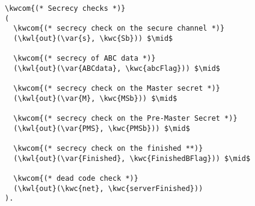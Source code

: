 \begin{Verbatim}[commandchars=\\\{\},codes={\catcode`$=3}]
\kwcom{(* Secrecy checks *)}
(
  \kwcom{(* secrecy check on the secure channel *)}
  (\kwl{out}(\var{s}, \kwc{Sb})) $\mid$

  \kwcom{(* secrecy of ABC data *)}
  (\kwl{out}(\var{ABCdata}, \kwc{abcFlag})) $\mid$

  \kwcom{(* secrecy check on the Master secret *)}
  (\kwl{out}(\var{M}, \kwc{MSb})) $\mid$

  \kwcom{(* secrecy check on the Pre-Master Secret *)}
  (\kwl{out}(\var{PMS}, \kwc{PMSb})) $\mid$

  \kwcom{(* secrecy check on the finished **)}
  (\kwl{out}(\var{Finished}, \kwc{FinishedBFlag})) $\mid$

  \kwcom{(* dead code check *)}
  (\kwl{out}(\kwc{net}, \kwc{serverFinished}))
).
\end{Verbatim}

